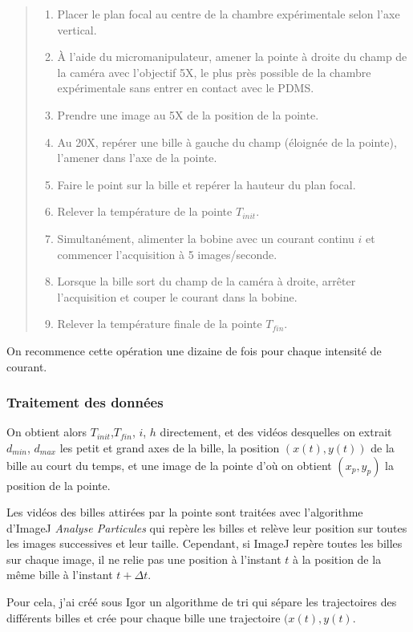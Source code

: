  \begin{quote}
 \begin{enumerate}
 \item Placer le plan focal au centre de la chambre expérimentale selon l'axe vertical.
 \item \`A l'aide du micromanipulateur, amener la pointe à droite du champ de la caméra avec l'objectif 5X, le plus près possible de la chambre expérimentale sans entrer en contact avec le PDMS. 
 \item Prendre une image au 5X de la position de la pointe.
 \item Au 20X, repérer une bille à gauche du champ (éloignée de la pointe), l'amener dans l'axe de la pointe. 
 \item Faire le point sur la bille et repérer la hauteur du plan focal. 
 \item Relever la température de la pointe $T_{init}$.
 \item Simultanément, alimenter la bobine avec un courant continu $i$ et commencer l'acquisition à 5 images/seconde. 
 \item Lorsque la bille sort du champ de la caméra à droite, arrêter l'acquisition et couper le courant dans la bobine.
 \item Relever la température finale de la pointe $T_{fin}$.
 \end{enumerate}
 \end{quote}
 
 On recommence cette opération une dizaine de fois pour chaque intensité de courant. 
 
 \subsubsection{Traitement des données}
 On obtient alors $T_{init}$,$T_{fin}$, $i$, $h$ directement, et des vidéos desquelles on extrait $d_{min}$, $d_{max}$ les petit et grand axes de la bille, la position $(x(t),y(t))$ de la bille au court du temps, et une image de la pointe d'où on obtient $(x_p,y_p)$ la position de la pointe. 
 
 Les vidéos des billes attirées par la pointe sont traitées avec l'algorithme d'ImageJ \emph{Analyse Particules} qui repère les billes et relève leur position sur toutes les images successives et leur taille. 
 Cependant, si ImageJ repère toutes les billes sur chaque image, il ne relie pas une position à l'instant $t$ à la position de la même bille à l'instant $t+ \Delta t$. 
 
 Pour cela, j'ai créé sous Igor un algorithme de tri qui sépare les trajectoires des différents billes et crée pour chaque bille une trajectoire $(x(t),y(t)$. 
 
